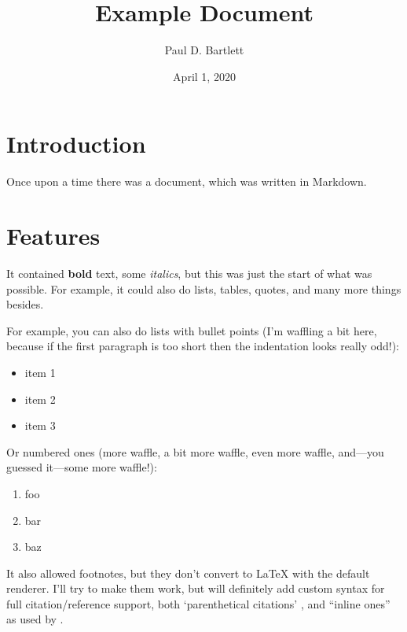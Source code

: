 \documentclass[11pt,a4paper]{article}
\title{Example Document}
\author{Paul D. Bartlett}
\date{April 1, 2020}
\begin{document}
\maketitle





\tableofcontents


\section{Introduction}

Once upon a time there was a document, which was written in Markdown.

\section{Features}

It contained \textbf{bold} text,  some \textit{italics}, but this was just the start of what
was possible. For example, it could also do lists, tables, quotes, and many more
things besides.

For example, you can also do lists with bullet points (I'm waffling a bit here,
because if the first paragraph is too short then the indentation looks really
odd!):
\begin{itemize}
\item 
item 1

\item 
item 2

\item 
item 3

\end{itemize}

Or numbered ones (more waffle, a bit more waffle, even more waffle, and---you
guessed it---some more waffle!):
\begin{enumerate}
\item 
foo

\item 
bar

\item 
baz

\end{enumerate}

It also allowed footnotes, but they don't convert to \LaTeX{} with the default
renderer. I'll try to make them work, but will definitely add custom syntax for
full citation/reference support, both `parenthetical citations' \parencite{Jones2000}, and
``inline ones'' as used by \textcite{Smith2001}.
\end{document}
